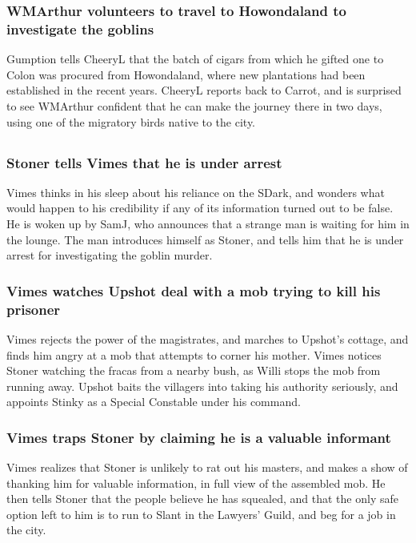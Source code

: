 \subsubsection{\Gls{WMArthur} volunteers to travel to Howondaland to investigate the goblins}
\Gls{Gumption} tells \Gls{CheeryL} that the batch of cigars from which he gifted one to \Gls{Colon}
was procured from Howondaland, where new plantations had been established in the recent years.
\Gls{CheeryL} reports back to \Gls{Carrot}, and is surprised to see \Gls{WMArthur} confident that
he can make the journey there in two days, using one of the migratory birds native to the city.

\subsection{}
\subsubsection{\Gls{Stoner} tells \Gls{Vimes} that he is under arrest}
\Gls{Vimes} thinks in his sleep about his reliance on the \Gls{SDark}, and wonders what would
happen to his credibility if any of its information turned out to be false. He is woken up by
\Gls{SamJ}, who announces that a strange man is waiting for him in the lounge. The man
introduces himself as \Gls{Stoner}, and tells him that he is under arrest for investigating the
goblin murder.

\subsubsection{\Gls{Vimes} watches \Gls{Upshot} deal with a mob trying to kill his prisoner}
\Gls{Vimes} rejects the power of the magistrates, and marches to \Gls{Upshot}'s cottage, and finds
him angry at a mob that attempts to corner his mother. \Gls{Vimes} notices \Gls{Stoner} watching
the fracas from a nearby bush, as \Gls{Willi} stops the mob from running away. \Gls{Upshot}
baits the villagers into taking his authority seriously, and appoints \Gls{Stinky} as a Special
Constable under his command.

\subsubsection{\Gls{Vimes} traps \Gls{Stoner} by claiming he is a valuable informant}
\Gls{Vimes} realizes that \Gls{Stoner} is unlikely to rat out his masters, and makes a show of
thanking him for valuable information, in full view of the assembled mob. He then tells \Gls{Stoner}
that the people believe he has squealed, and that the only safe option left to him is to run to
\Gls{Slant} in the Lawyers' Guild, and beg for a job in the city.

